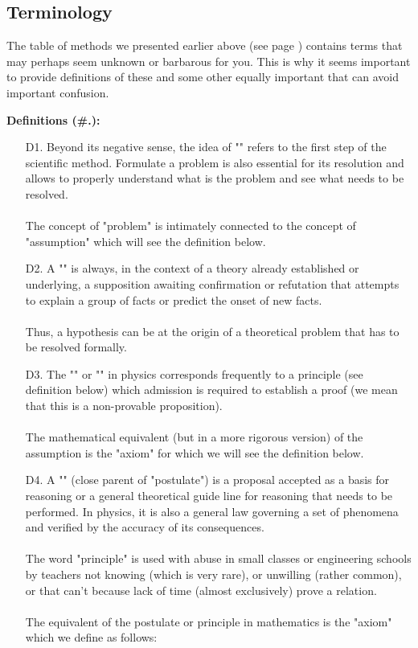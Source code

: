 	\subsection{Terminology}

The table of methods we presented earlier above (see page \pageref{methodology table}) contains terms that may perhaps seem unknown or barbarous for you. This is why it seems important to provide definitions of these and some other equally important that can avoid important confusion. 

\textbf{Definitions (\#\thesection.\mydef):}

\begin{itemize}
	\item[D1.] Beyond its negative sense, the idea of "" refers to the first step of the scientific method. Formulate a problem is also essential for its resolution and allows to properly understand what is the problem and see what needs to be resolved. \\\\
	The concept of "problem" is intimately connected to the concept of "assumption" which will see the definition below. 

	\item[D2.] A "" is always, in the context of a theory already established or underlying, a supposition awaiting confirmation or refutation that attempts to explain a group of facts or predict the onset of new facts.\\\\
	Thus, a hypothesis can be at the origin of a theoretical problem that has to be resolved formally. 

	\item[D3.] The "" or  "" in physics corresponds frequently to a principle (see definition below) which admission is required to establish a proof (we mean that this is a non-provable proposition).\\\\
	The mathematical equivalent (but in a more rigorous version) of the assumption is the "axiom" for which we will see the definition below. 

	\item[D4.] A "" (close parent of "postulate") is a proposal accepted as a basis for reasoning or a general theoretical guide line for reasoning that needs to be performed. In physics, it is also a general law governing a set of phenomena and verified by the accuracy of its consequences. \\\\
The word "principle" is used with abuse in small classes or engineering schools by teachers not knowing (which is very rare), or unwilling (rather common), or that can't because lack of time (almost exclusively) prove a relation.\\\\
The equivalent of the postulate or principle in mathematics is the "axiom" which we define as follows: 


\end{itemize}
